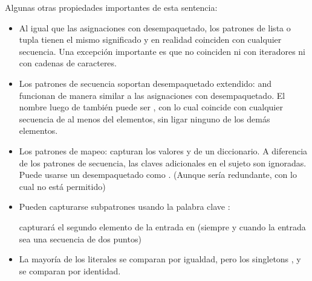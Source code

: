 \documentclass[a5paper,10pt,spanish]{sphinxmanual}
\begin{document}
\sphinxAtStartPar
Algunas otras propiedades importantes de esta sentencia:
\begin{itemize}
\item {} 
\sphinxAtStartPar
Al igual que las asignaciones con desempaquetado, los patrones de lista o tupla tienen el mismo significado y en realidad coinciden con cualquier secuencia. Una excepción importante es que no coinciden ni con iteradores ni con cadenas de caracteres.

\item {} 
\sphinxAtStartPar
Los patrones de secuencia soportan desempaquetado extendido: \sphinxcode{\sphinxupquote{{[}x, y, *otros{]}}} and  funcionan de manera similar a las asignaciones con desempaquetado.  El nombre luego de \sphinxcode{\sphinxupquote{*}} también puede ser \sphinxcode{\sphinxupquote{\_}}, con lo cual  coincide con cualquier secuencia de al menos del elementos, sin ligar ninguno de los demás elementos.

\item {} 
\sphinxAtStartPar
Los patrones de mapeo:  capturan los valores  y  de un diccionario.  A diferencia de los patrones de secuencia, las claves adicionales en el sujeto son ignoradas.  Puede usarse un desempaquetado como  .  (Aunque \sphinxcode{\sphinxupquote{**\_}} sería redundante, con lo cual no está permitido)

\item {} 
\sphinxAtStartPar
Pueden capturarse subpatrones usando la palabra clave :

\begin{sphinxVerbatim}[commandchars=\\\{\}]
       
\end{sphinxVerbatim}

\sphinxAtStartPar
capturará el segundo elemento de la entrada en  (siempre y cuando la entrada sea una secuencia de dos puntos)

\item {} 
\sphinxAtStartPar
La mayoría de los literales se comparan por igualdad, pero los singletons ,  y  se comparan por identidad.


\end{itemize}
\end{document}
